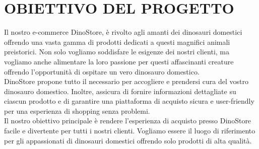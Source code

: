 \section{OBIETTIVO DEL PROGETTO}
Il nostro e-commerce DinoStore, è rivolto agli amanti dei dinosauri domestici offrendo una vasta gamma di prodotti dedicati a questi magnifici animali preistorici. Non solo vogliamo soddisfare le esigenze dei nostri clienti, ma vogliamo anche alimentare la loro passione per questi affascinanti creature offrendo l'opportunità di ospitare un vero dinosauro domestico.
\\
DinoStore propone tutto il necessario per accogliere e prendersi cura del vostro dinosauro domestico. Inoltre, assicura di fornire informazioni dettagliate su ciascun prodotto e di garantire una piattaforma di acquisto sicura e user-friendly per una esperienza di shopping senza problemi.
\\
Il nostro obiettivo principale è rendere l'esperienza di acquisto presso DinoStore facile e divertente per tutti i nostri clienti. Vogliamo essere il luogo di riferimento per gli appassionati di dinosauri domestici offrendo solo prodotti di alta qualità.